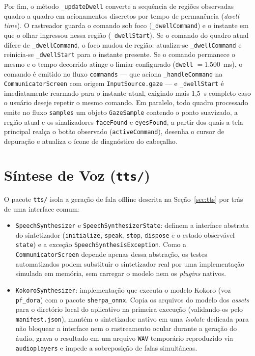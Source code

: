 Por fim, o método \texttt{\_updateDwell} converte a sequência de regiões observadas quadro a quadro em acionamentos discretos por tempo de permanência (\textit{dwell time}). O rastreador guarda o comando sob foco (\texttt{\_dwellCommand}) e o instante em que o olhar ingressou nessa região (\texttt{\_dwellStart}). Se o comando do quadro atual difere de \texttt{\_dwellCommand}, o foco mudou de região: atualiza-se \texttt{\_dwellCommand} e reinicia-se \texttt{\_dwellStart} para o instante presente. Se o comando permanece o mesmo e o tempo decorrido atinge o limiar configurado (\texttt{dwell} $= 1.500$~ms), o comando é emitido no fluxo \texttt{commands} --- que aciona \texttt{\_handleCommand} na \texttt{CommunicatorScreen} com origem \texttt{InputSource.gaze} --- e \texttt{\_dwellStart} é imediatamente rearmado para o instante atual, exigindo mais 1,5~s completo caso o usuário deseje repetir o mesmo comando. Em paralelo, todo quadro processado emite no fluxo \texttt{samples} um objeto \texttt{GazeSample} contendo o ponto suavizado, a região atual e os sinalizadores \texttt{faceFound} e \texttt{eyesFound}, a partir dos quais a tela principal realça o botão observado (\texttt{activeCommand}), desenha o cursor de depuração e atualiza o ícone de diagnóstico do cabeçalho.

  \section{Síntese de Voz (\texttt{tts/})} \label{sec:met_tts}

O pacote \texttt{tts/} isola a geração de fala offline descrita na Seção~\ref{sec:tts} por trás de uma interface comum:

\begin{itemize}
    \item \texttt{SpeechSynthesizer} e \texttt{SpeechSynthesizerState}: definem a interface abstrata do sintetizador (\texttt{initialize}, \texttt{speak}, \texttt{stop}, \texttt{dispose} e o estado observável \texttt{state}) e a exceção \texttt{SpeechSynthesisException}. Como a \texttt{CommunicatorScreen} depende apenas dessa abstração, os testes automatizados podem substituir o sintetizador real por uma implementação simulada em memória, sem carregar o modelo nem os \textit{plugins} nativos.
    \item \texttt{KokoroSynthesizer}: implementação que executa o modelo Kokoro (voz \texttt{pf\_dora}) com o pacote \texttt{sherpa\_onnx}. Copia os arquivos do modelo dos \textit{assets} para o diretório local do aplicativo na primeira execução (validando-os pelo \texttt{manifest.json}), mantém o sintetizador nativo em uma \textit{isolate} dedicada para não bloquear a interface nem o rastreamento ocular durante a geração do áudio, grava o resultado em um arquivo \texttt{WAV} temporário reproduzido via \texttt{audioplayers} e impede a sobreposição de falas simultâneas.
\end{itemize}

